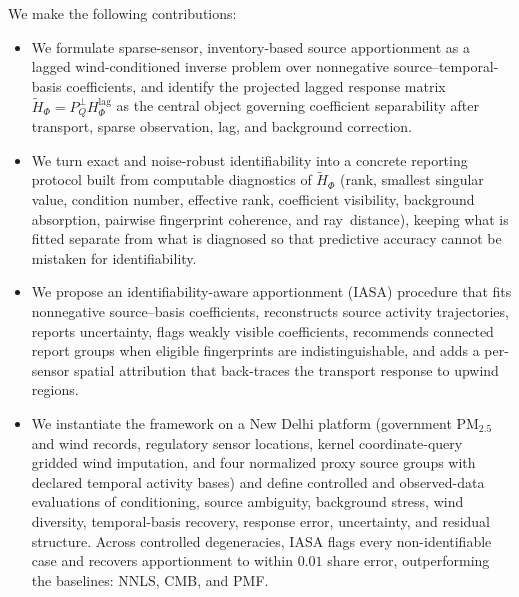 We make the following contributions:
\begin{itemize}[leftmargin=*,itemsep=0pt,topsep=0pt]
    \item We formulate sparse-sensor, inventory-based source apportionment as a
    lagged wind-conditioned inverse problem over nonnegative
    source--temporal-basis coefficients, and identify the projected lagged
    response matrix \(\widetilde H_\Phi=P_Q^\perp H_{\Phi}^{\mathrm{lag}}\) as the
    central object governing coefficient separability after transport, sparse
    observation, lag, and background correction.
    \item We turn exact and noise-robust identifiability into a concrete
    reporting protocol built from computable diagnostics of \(\widetilde H_\Phi\)
    (rank, smallest singular value, condition number, effective rank, coefficient
    visibility, background absorption, pairwise fingerprint coherence, and
    \mbox{ray distance}), keeping what is fitted separate from what is diagnosed
    so that predictive accuracy cannot be mistaken for identifiability.
    \item We propose an identifiability-aware apportionment (IASA) procedure that
    fits nonnegative source--basis coefficients, reconstructs source activity
    trajectories, reports uncertainty, flags weakly visible coefficients,
    recommends connected report groups when eligible fingerprints are
    indistinguishable, and adds a per-sensor spatial attribution that back-traces
    the transport response to upwind regions.
    \item We instantiate the framework on a New Delhi platform (government
    PM\(_{2.5}\) and wind records, regulatory sensor locations, kernel
    coordinate-query gridded wind imputation, and four normalized proxy source
    groups with declared temporal activity bases) and define controlled and
    observed-data evaluations of conditioning, source ambiguity, background
    stress, wind diversity, temporal-basis recovery, response error, uncertainty,
    and residual structure. Across controlled degeneracies, IASA flags every non-identifiable case and recovers apportionment to within \(0.01\) share error, outperforming the baselines: NNLS, CMB, and PMF.
\end{itemize}
